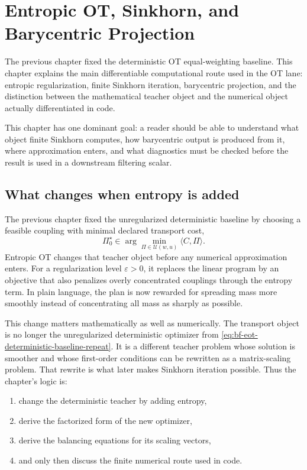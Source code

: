 \chapter{Entropic OT, Sinkhorn, and Barycentric Projection}
\label{ch:bf-dpf-entropic-ot-sinkhorn}

The previous chapter fixed the deterministic OT equal-weighting baseline.  This
chapter explains the main differentiable computational route used in the OT lane:
entropic regularization, finite Sinkhorn iteration, barycentric projection, and
the distinction between the mathematical teacher object and the numerical object
actually differentiated in code.

This chapter has one dominant goal: a reader should be able to understand what
object finite Sinkhorn computes, how barycentric output is produced from it, where
approximation enters, and what diagnostics must be checked before the result is
used in a downstream filtering scalar.

\section{What changes when entropy is added}
\label{sec:bf-eot-what-changes}

The previous chapter fixed the unregularized deterministic baseline by choosing a
feasible coupling with minimal declared transport cost,
\begin{equation}
\label{eq:bf-eot-deterministic-baseline-repeat}
  \Pi_0^\star
  \in
  \arg\min_{\Pi\in\mathcal U(w,u)}
  \langle C,\Pi\rangle.
\end{equation}
Entropic OT changes that teacher object before any numerical approximation enters.
For a regularization level \(\varepsilon>0\), it replaces the linear program by
an objective that also penalizes overly concentrated couplings through the entropy
term.  In plain language, the plan is now rewarded for spreading mass more smoothly
instead of concentrating all mass as sharply as possible.

This change matters mathematically as well as numerically.  The transport object is
no longer the unregularized deterministic optimizer from
\eqref{eq:bf-eot-deterministic-baseline-repeat}.  It is a different teacher problem
whose solution is smoother and whose first-order conditions can be rewritten as a
matrix-scaling problem.  That rewrite is what later makes Sinkhorn iteration
possible.  Thus the chapter's logic is:
\begin{enumerate}[label=(\roman*)]
  \item change the deterministic teacher by adding entropy,
  \item derive the factorized form of the new optimizer,
  \item derive the balancing equations for its scaling vectors,
  \item and only then discuss the finite numerical route used in code.
\end{enumerate}

